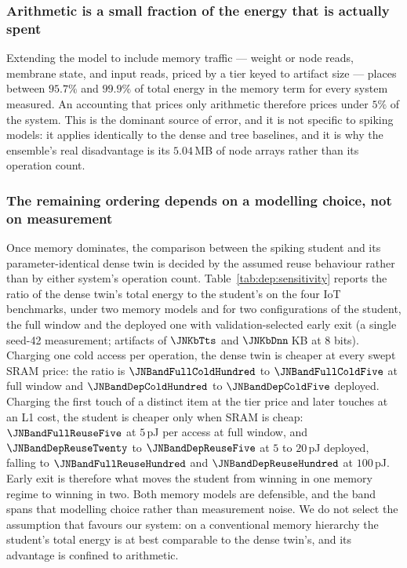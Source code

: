 \subsubsection{Arithmetic is a small fraction of the energy that is actually spent}
Extending the model to include memory traffic --- weight or node reads, membrane
state, and input reads, priced by a tier keyed to artifact size --- places
between $95.7\%$ and $99.9\%$ of total energy in the memory term for every system
measured. An accounting that prices only arithmetic therefore prices under $5\%$
of the system. This is the dominant source of error, and it is not specific to
spiking models: it applies identically to the dense and tree baselines, and it is
why the ensemble's real disadvantage is its $5.04$\,MB of node arrays rather than
its operation count.

\subsubsection{The remaining ordering depends on a modelling choice, not on measurement}
Once memory dominates, the comparison between the spiking student and its
parameter-identical dense twin is decided by the assumed reuse behaviour rather
than by either system's operation count. Table~\ref{tab:dep:sensitivity} reports
the ratio of the dense twin's total energy to the student's on the four IoT
benchmarks, under two memory models and for two configurations of the student,
the full window and the deployed one with validation-selected early exit (a
single seed-42 measurement; artifacts of $\JNKbTts$ and $\JNKbDnn$\,KB at 8 bits).
Charging one cold access per operation, the dense twin is cheaper at every swept
SRAM price: the ratio is $\JNBandFullColdHundred$ to $\JNBandFullColdFive$ at full window and
$\JNBandDepColdHundred$ to $\JNBandDepColdFive$ deployed. Charging the first touch of a distinct item at the tier price and later
touches at an L1 cost, the student is cheaper only when SRAM is cheap: $\JNBandFullReuseFive$ at
$5$\,pJ per access at full window, and $\JNBandDepReuseTwenty$ to $\JNBandDepReuseFive$ at $5$ to $20$\,pJ
deployed, falling to $\JNBandFullReuseHundred$ and $\JNBandDepReuseHundred$ at $100$\,pJ. Early exit is therefore what
moves the student from winning in one memory regime to winning in two. Both memory
models are defensible, and the band spans that modelling choice rather than
measurement noise. We do not select the assumption that favours our system: on a
conventional memory hierarchy the student's total energy is at best comparable
to the dense twin's, and its advantage is confined to arithmetic.

